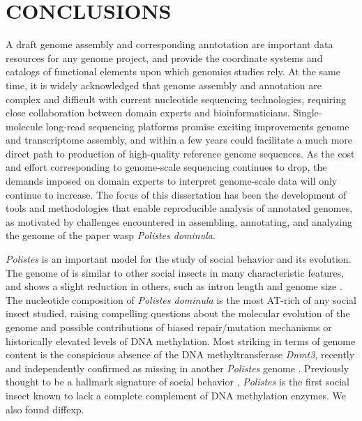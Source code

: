 \chapter{CONCLUSIONS}

A draft genome assembly and corresponding anntotation are important data resources for any genome project, and provide the coordinate systems and catalogs of functional elements upon which genomics studies rely.
At the same time, it is widely acknowledged that genome assembly and annotation are complex and difficult with current nucleotide sequencing technologies, requiring close collaboration between domain experts and bioinformaticians.
Single-molecule long-read sequencing platforms promise exciting improvements genome and transcriptome assembly, and within a few years could facilitate a much more direct path to production of high-quality reference genome sequences.
As the cost and effort corresponding to genome-scale sequencing continues to drop, the demands imposed on domain experts to interpret genome-scale data will only continue to increase.
The focus of this dissertation has been the development of tools and methodologies that enable reproducible analysis of annotated genomes, as motivated by challenges encountered in assembling, annotating, and analyzing the genome of the paper wasp \textit{Polistes dominula}.

\textit{Polistes} is an important model for the study of social behavior and its evolution.
The genome of  is similar to other social insects in many characteristic features, and shows a slight reduction in others, such as intron length and genome size \cite{PdomGenome}.
The nucleotide composition of \textit{Polistes dominula} is the most AT-rich of any social insect studied, raising compelling questions about the molecular evolution of the genome and possible contributions of biased repair/mutation mechanisms or historically elevated levels of DNA methylation.
Most striking in terms of genome content is the conspicious absence of the DNA methyltransferase \textit{Dnmt3}, recently and independently confirmed as missing in another \textit{Polistes} genome \cite{PcanGenome}.
Previously thought to be a hallmark signature of social behavior \cite{Glastad2011}, \textit{Polistes} is the first social insect known to lack a complete complement of DNA methylation enzymes.
We also found diffexp.

